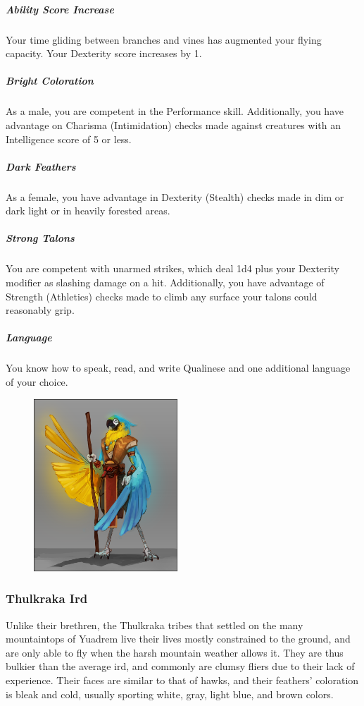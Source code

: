     \subparagraph{Ability Score Increase} Your time gliding between branches and vines has augmented your flying capacity.
    Your Dexterity score increases by 1.

    \subparagraph{Bright Coloration} As a male, you are competent in the Performance skill.
    Additionally, you have advantage on Charisma (Intimidation) checks made against creatures with an Intelligence score of 5 or less.

    \subparagraph{Dark Feathers} As a female, you have advantage in Dexterity (Stealth) checks made in dim or dark light or in heavily forested areas.

    \subparagraph{Strong Talons} You are competent with unarmed strikes, which deal 1d4 plus your Dexterity modifier as slashing damage on a hit.
    Additionally, you have advantage of Strength (Athletics) checks made to climb any surface your talons could reasonably grip.

    \subparagraph{Language} You know how to speak, read, and write Qualinese and one additional language of your choice.

\begin{figure}[!b]
    \centering
    \includegraphics[width=0.48\textwidth]{04kins/img/12ird_qulbaba.png}
\end{figure}

\subsubsection{Thulkraka Ird}
    Unlike their brethren, the Thulkraka tribes that settled on the many mountaintops of Yuadrem live their lives mostly constrained to the ground, and are only able to fly when the harsh mountain weather allows it.
    They are thus bulkier than the average ird, and commonly are clumsy fliers due to their lack of experience.
    Their faces are similar to that of hawks, and their feathers' coloration is bleak and cold, usually sporting white, gray, light blue, and brown colors.

